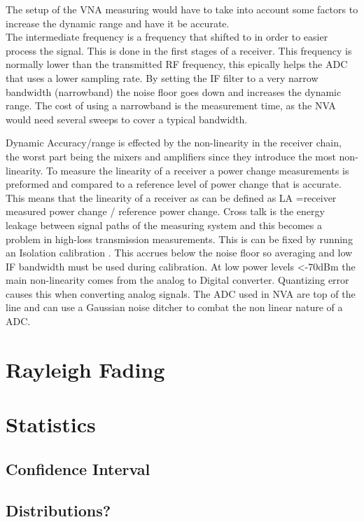 The setup of the VNA measuring would have to take into account some factors to increase the dynamic range and have it be accurate. \\
The intermediate frequency is a frequency that shifted to in order to easier process the signal. This is done in the first stages of a receiver. This frequency is normally lower than the transmitted RF frequency, this epically helps the ADC that uses a lower sampling rate. 
By setting the IF filter to a very narrow bandwidth (narrowband) the noise floor goes down and increases the dynamic range. The cost of using a narrowband is the measurement time, as the NVA would need several sweeps to cover a typical bandwidth.

Dynamic Accuracy/range is effected by the non-linearity in the receiver chain, the worst part being the mixers and amplifiers since they introduce the most non-linearity. To measure the linearity of a receiver a power change measurements is preformed and compared to a reference level of power change that is accurate. This means that the linearity of a receiver as can be defined as LA =receiver measured power change / reference power change.
Cross talk is the energy leakage between signal paths of the measuring system and this becomes a problem in high-loss transmission measurements. This is can be fixed by running an Isolation calibration \citep{crosstalk}. This accrues below the noise floor so averaging and low IF bandwidth must be used during calibration.
At low power levels <-70dBm the main non-linearity comes from the analog to Digital converter. Quantizing error causes this when converting analog signals. The ADC used in NVA are top of the line and can use a Gaussian noise ditcher to combat the non linear nature of a ADC. 



\section{Rayleigh Fading}
\section{Statistics}
\subsection{Confidence Interval}
\subsection{Distributions?}
